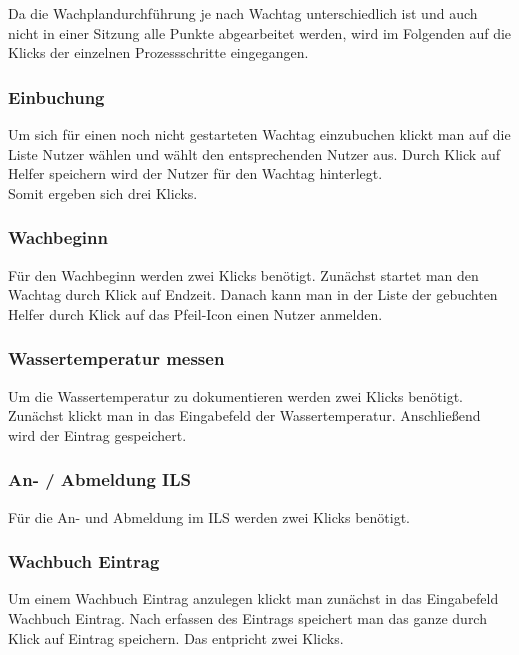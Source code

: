 \documentclass[fontsize=12pt,openright,oneside,paper=a4,BCOR=1cm]{scrbook}
\begin{document}
Da die Wachplandurchführung je nach Wachtag unterschiedlich ist und auch nicht in einer Sitzung alle Punkte abgearbeitet werden, wird im Folgenden auf die Klicks der einzelnen Prozessschritte eingegangen.

\subsubsection{Einbuchung}
Um sich für einen noch nicht gestarteten Wachtag einzubuchen klickt man auf die Liste \glqq Nutzer wählen\grqq{} und wählt den entsprechenden Nutzer aus. Durch Klick auf \glqq Helfer speichern\grqq{} wird der Nutzer für den Wachtag hinterlegt. \\
Somit ergeben sich drei Klicks.

\subsubsection{Wachbeginn}
Für den Wachbeginn werden zwei Klicks benötigt. Zunächst startet man den Wachtag durch Klick auf \glqq Endzeit. Danach kann man in der Liste der gebuchten Helfer durch Klick auf das Pfeil-Icon einen Nutzer anmelden.

\subsubsection{Wassertemperatur messen}
Um die Wassertemperatur zu dokumentieren werden zwei Klicks benötigt. Zunächst klickt man in das Eingabefeld der Wassertemperatur. Anschließend wird der Eintrag gespeichert.

\subsubsection{An- / Abmeldung ILS}
Für die An- und Abmeldung im ILS werden zwei Klicks benötigt.

\subsubsection{Wachbuch Eintrag}
Um einem Wachbuch Eintrag anzulegen klickt man zunächst in das Eingabefeld \glqq Wachbuch Eintrag\grqq{}. Nach erfassen des Eintrags speichert man das ganze durch Klick auf \glqq Eintrag speichern\grqq{}. Das entpricht zwei Klicks.
\end{document}
